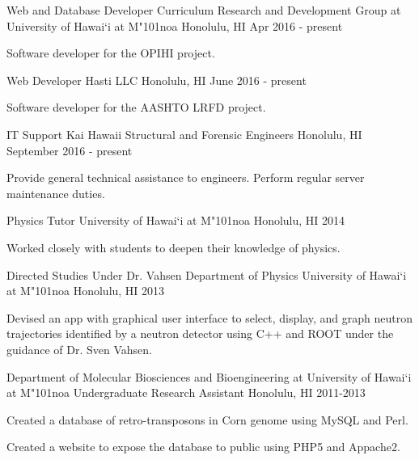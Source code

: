 \begin{cventries}
	\cventry
	{Web and Database Developer}
	{Curriculum Research and Development Group at University of Hawai`i at M{\char"101}noa}
	{Honolulu, HI}
	{Apr 2016 - present}
	{
		\begin{cvitems}
			\item {Software developer for the OPIHI project.}
		\end{cvitems}
	}
    \cventry
    {Web Developer}
    {Hasti LLC}
    {Honolulu, HI}
    {June 2016 - present}
    {
        \begin{cvitems}
            \item {Software developer for the AASHTO LRFD project.}
        \end{cvitems}
    }
    \cventry
    {IT Support}
    {Kai Hawaii Structural and Forensic Engineers}
    {Honolulu, HI}
    {September 2016 - present}
    {
	    \begin{cvitems}
		    \item{Provide general technical assistance to engineers. Perform regular server maintenance duties.}	
	    \end{cvitems}	
    }
	
	\cventry
	{Physics Tutor}
	{University of Hawai`i at M{\char"101}noa}
	{Honolulu, HI}
	{2014}
	{
		\begin{cvitems}
			\item {Worked closely with students to deepen their knowledge of physics.}
		\end{cvitems}
	}
	\cventry
	{Directed Studies Under Dr. Vahsen}
	{Department of Physics University of Hawai`i at M{\char"101}noa}
	{Honolulu, HI}
	{2013}
	{
		\begin{cvitems}
			\item {Devised an app with graphical user interface to select, display, and graph neutron trajectories identified by a neutron detector using C++ and
				ROOT under the guidance of Dr. Sven Vahsen.}
		\end{cvitems}
	}
	\cventry
	{Department of Molecular Biosciences and Bioengineering at University of Hawai`i at M{\char"101}noa}
	{Undergraduate Research Assistant}
	{Honolulu, HI}
	{2011-2013}
	{
		\begin{cvitems}
			\item {Created a database of retro-transposons in Corn genome using MySQL and Perl.}
			\item {Created a website to expose the database to public using PHP5 and Appache2.}
		\end{cvitems}
	}
\end{cventries}

